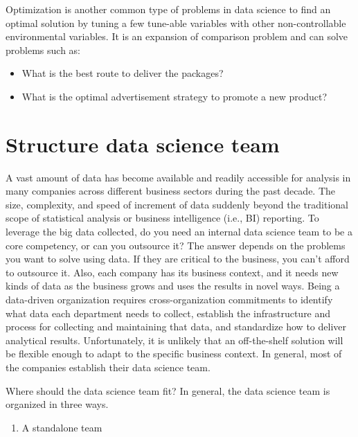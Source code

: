 \documentclass[12pt,]{krantz}
\providecommand{\tightlist}{%
  \setlength{\itemsep}{0pt}\setlength{\parskip}{0pt}}
\begin{document}
Optimization is another common type of problems in data science to find an optimal solution by tuning a few tune-able variables with other non-controllable environmental variables. It is an expansion of comparison problem and can solve problems such as:

\begin{itemize}
\tightlist
\item
  What is the best route to deliver the packages?
\item
  What is the optimal advertisement strategy to promote a new product?
\end{itemize}

\hypertarget{structure-data-science-team}{%
\section{Structure data science team}\label{structure-data-science-team}}

A vast amount of data has become available and readily accessible for analysis in many companies across different business sectors during the past decade. The size, complexity, and speed of increment of data suddenly beyond the traditional scope of statistical analysis or business intelligence (i.e., BI) reporting. To leverage the big data collected, do you need an internal data science team to be a core competency, or can you outsource it? The answer depends on the problems you want to solve using data. If they are critical to the business, you can't afford to outsource it. Also, each company has its business context, and it needs new kinds of data as the business grows and uses the results in novel ways. Being a data-driven organization requires cross-organization commitments to identify what data each department needs to collect, establish the infrastructure and process for collecting and maintaining that data, and standardize how to deliver analytical results. Unfortunately, it is unlikely that an off-the-shelf solution will be flexible enough to adapt to the specific business context. In general, most of the companies establish their data science team.

Where should the data science team fit? In general, the data science team is organized in three ways.

\begin{enumerate}
\def\labelenumi{(\arabic{enumi})}
\tightlist
\item
  A standalone team
\end{enumerate}
\end{document}
